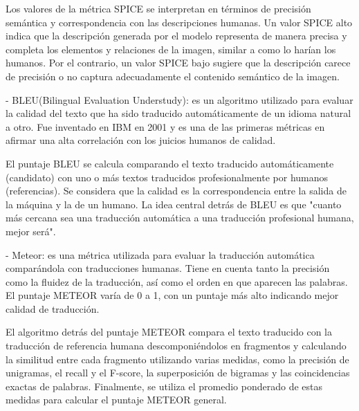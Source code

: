 Los valores de la métrica SPICE se interpretan en términos de precisión semántica y correspondencia con las descripciones humanas. Un valor SPICE alto indica que la descripción generada por el modelo representa de manera precisa y completa los elementos y relaciones de la imagen, similar a como lo harían los humanos. Por el contrario, un valor SPICE bajo sugiere que la descripción carece de precisión o no captura adecuadamente el contenido semántico de la imagen.

- BLEU(Bilingual Evaluation Understudy): es un algoritmo utilizado para evaluar la calidad del texto que ha sido traducido automáticamente de un idioma natural a otro. Fue inventado en IBM en 2001 y es una de las primeras métricas en afirmar una alta correlación con los juicios humanos de calidad.

El puntaje BLEU se calcula comparando el texto traducido automáticamente (candidato) con uno o más textos traducidos profesionalmente por humanos (referencias). Se considera que la calidad es la correspondencia entre la salida de la máquina y la de un humano. La idea central detrás de BLEU es que "cuanto más cercana sea una traducción automática a una traducción profesional humana, mejor será".


- Meteor: es una métrica utilizada para evaluar la traducción automática comparándola con traducciones humanas. Tiene en cuenta tanto la precisión como la fluidez de la traducción, así como el orden en que aparecen las palabras. El puntaje METEOR varía de 0 a 1, con un puntaje más alto indicando mejor calidad de traducción.

El algoritmo detrás del puntaje METEOR compara el texto traducido con la traducción de referencia humana descomponiéndolos en fragmentos y calculando la similitud entre cada fragmento utilizando varias medidas, como la precisión de unigramas, el recall y el F-score, la superposición de bigramas y las coincidencias exactas de palabras. Finalmente, se utiliza el promedio ponderado de estas medidas para calcular el puntaje METEOR general.
